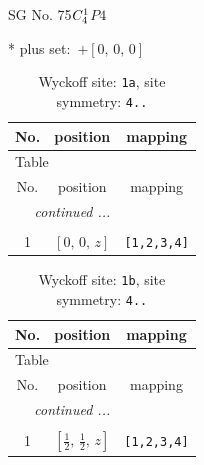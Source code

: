 \documentclass[fleqn,8pt]{jsarticle}
\begin{document}
\setcounter{MaxMatrixCols}{32}

\renewcommand{\tablename}{Table~}
\renewcommand{\figurename}{Figure~}
\begin{center}
\LARGE
SG No. 75\quad$C_{\rm 4}^{1}$\quad$P4$\quad[ tetragonal ]
\end{center}
* plus set:\,\,\,$+\left[ 0,\, 0,\, 0 \right]$
\renewcommand{\arraystretch}{1.2}
\begin{longtable}{ccc}
\caption{Wyckoff site: {\tt 1a}, site symmetry: {\tt 4..}}
 \\
 \hline \hline
No. & position & mapping \\ \hline \endfirsthead

\multicolumn{2}{l}{\tablename\ \thetable{}} \\
 \hline \hline
No. & position & mapping \\ \hline \endhead

 \hline \hline
\multicolumn{2}{r}{\footnotesize\it continued ...} \\ \endfoot

 \hline \hline
\multicolumn{2}{r}{} \\ \endlastfoot

1 & $\left[ 0,\, 0,\, z \right]$ & {\tt [1,2,3,4]} \\
\end{longtable}
\renewcommand{\arraystretch}{1.2}
\begin{longtable}{ccc}
\caption{Wyckoff site: {\tt 1b}, site symmetry: {\tt 4..}}
 \\
 \hline \hline
No. & position & mapping \\ \hline \endfirsthead

\multicolumn{2}{l}{\tablename\ \thetable{}} \\
 \hline \hline
No. & position & mapping \\ \hline \endhead

 \hline \hline
\multicolumn{2}{r}{\footnotesize\it continued ...} \\ \endfoot

 \hline \hline
\multicolumn{2}{r}{} \\ \endlastfoot

1 & $\left[ \frac{1}{2},\, \frac{1}{2},\, z \right]$ & {\tt [1,2,3,4]} \\
\end{longtable}
\renewcommand{\arraystretch}{1.2}
\end{document}
